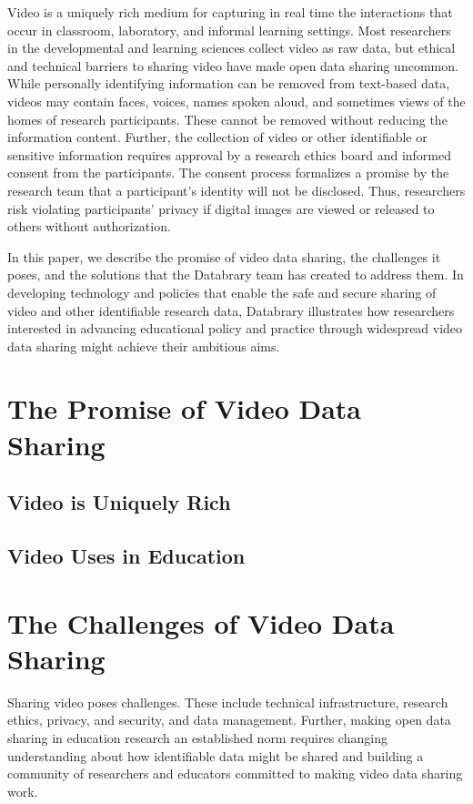 \documentclass[letterpaper,man,natbib]{apa6}
\begin{document}
Video is a uniquely rich medium for capturing in real time the interactions that occur in classroom, laboratory, and informal learning settings. 
Most researchers in the developmental and learning sciences collect video as raw data, but ethical and technical barriers to sharing video have made open data sharing uncommon. 
While personally identifying information can be removed from text-based data, videos may contain faces, voices, names spoken aloud, and sometimes views of the homes of research participants. 
These cannot be removed without reducing the information content. Further, the collection of video or other identifiable or sensitive information requires approval by a research ethics board and informed consent from the participants. 
The consent process formalizes a promise by the research team that a participant's identity will not be disclosed. Thus, researchers risk violating participants’ privacy if digital images are viewed or released to others without authorization.

In this paper, we describe the promise of video data sharing, the challenges it poses, and the solutions that the Databrary team has created to address them.
In developing technology and policies that enable the safe and secure sharing of video and other identifiable research data, Databrary illustrates how researchers interested in advancing educational policy and practice through widespread video data sharing might achieve their ambitious aims.

\section{The Promise of Video Data Sharing}

\subsection{Video is Uniquely Rich}

\subsection{Video Uses in Education}

\section{The Challenges of Video Data Sharing}

Sharing video poses challenges. 
These include technical infrastructure, research ethics, privacy, and security, and data management. 
Further, making open data sharing in education research an established norm requires changing understanding about how identifiable data might be shared and building a community of researchers and educators committed to making video data sharing work.
\end{document}
